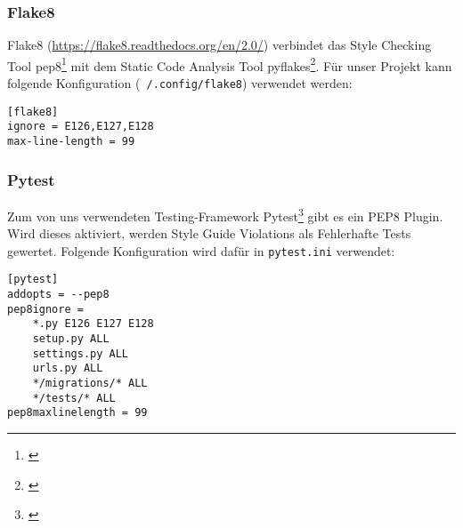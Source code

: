 \documentclass{article}
\begin{document}
\subsubsection{Flake8}

Flake8 (\url{https://flake8.readthedocs.org/en/2.0/}) verbindet das Style
Checking Tool pep8\footnote{\url{}} mit dem Static Code Analysis Tool
pyflakes\footnote{\url{}}. Für unser Projekt kann folgende Konfiguration
(\texttt{~/.config/flake8}) verwendet werden:

\begin{verbatim}
[flake8]
ignore = E126,E127,E128
max-line-length = 99
\end{verbatim}

\subsubsection{Pytest}

Zum von uns verwendeten Testing-Framework Pytest\footnote{\url{}} gibt es ein
PEP8 Plugin. Wird dieses aktiviert, werden Style Guide Violations als
Fehlerhafte Tests gewertet. Folgende Konfiguration wird dafür in
\texttt{pytest.ini} verwendet:

\begin{verbatim}
[pytest]
addopts = --pep8
pep8ignore =
    *.py E126 E127 E128
    setup.py ALL
    settings.py ALL
    urls.py ALL
    */migrations/* ALL
    */tests/* ALL
pep8maxlinelength = 99
\end{verbatim}
\end{document}
